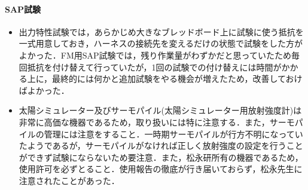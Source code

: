 \paragraph{SAP試験}
\begin{itemize}
	\item 出力特性試験では，あらかじめ大きなブレッドボード上に試験に使う抵抗を一式用意しておき，ハーネスの接続先を変えるだけの状態で試験をした方がよかった．FM用SAP試験では，残り作業量がわずかだと思っていたため毎回抵抗を付け替えて行っていたが，1回の試験での付け替えには時間がかかる上に，最終的には何かと追加試験をやる機会が増えたため，改善しておけばよかった．
	\item 太陽シミュレーター及びサーモパイル(太陽シミュレーター用放射強度計)は非常に高価な機器であるため，取り扱いには特に注意する．また，サーモパイルの管理には注意をすること．一時期サーモパイルが行方不明になっていたようであるが，サーモパイルがなければ正しく放射強度の設定を行うことができず試験にならないため要注意．また，松永研所有の機器であるため，使用許可を必ずとること．使用報告の徹底が行き届いておらず，松永先生に注意されたことがあった．
\end{itemize}